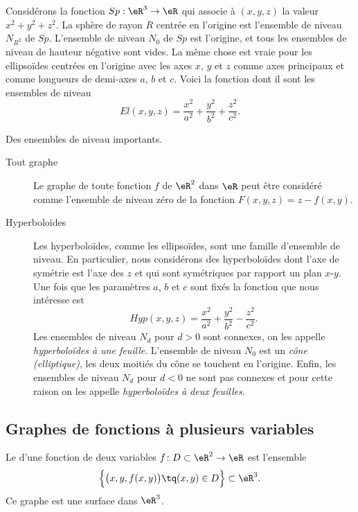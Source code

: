 Considérons la fonction \( Sp: \eR^3\to \eR\) qui associe à \( (x,y,z)\) la valeur \( x^2+y^2+z^2\). La sphère de rayon \( R\) centrée en l'origine est l'ensemble de niveau \( N_{R^2}\) de \( Sp\). L'ensemble de niveau \( N_{0}\) de \( Sp\) est l'origine, et tous les ensembles de niveau de hauteur négative sont vides. La même chose est vraie pour les ellipsoïdes centrées en l'origine avec les axes \( x\), \( y\) et \( z\) comme axes principaux et comme longueurs de demi-axes \( a\), \( b\) et \( c\). Voici la fonction dont il sont les ensembles de niveau
\[
	El(x,y,z)= \frac{x^2}{a^2}+\frac{y^2}{b^2}+\frac{z^2}{c^2}.
\]
\begin{example}
	Des ensembles de niveau importants.
	\begin{description}
		\item[Tout graphe]
			Le graphe de toute fonction \( f\)  de \( \eR^2\) dans \( \eR\) peut être considéré comme l'ensemble de niveau zéro de la fonction \( F(x,y,z)=z-f(x,y)\).

		\item[Hyperboloïdes]
			Les hyperboloïdes, comme les ellipsoïdes, sont une famille d'ensemble de niveau. En particulier, nous considérons des hyperboloïdes dont l'axe de symétrie est l'axe des \( z\) et qui sont symétriques par rapport un plan \( x\)-\( y\).  Une fois que les paramètres  \( a\), \( b\) et \( c\) sont fixés la fonction que nous intéresse est
			\[
				Hyp(x,y,z)= \frac{x^2}{a^2}+\frac{y^2}{b^2}-\frac{z^2}{c^2}.
			\]
			Les ensembles de niveau \( N_d\) pour \( d>0\) sont connexes, on les appelle \emph{hyperboloïdes à une feuille}. L'ensemble de niveau \( N_0\) est un \emph{cône (elliptique)}, les deux moitiés du cône se touchent en l'origine. Enfin, les ensembles de niveau \( N_d\) pour \( d<0\) ne sont  pas connexes et pour cette raison on les appelle \emph{hyperboloïdes à deux feuilles}.
	\end{description}
\end{example}

\subsection{Graphes de fonctions à plusieurs variables}

Le  d'une fonction de deux variables \( f\colon D\subset\eR^2\to \eR\) est l'ensemble
\begin{equation}
	\Big\{   \big( x,y,f(x,y) \big) \tq (x,y)\in D \Big\}\subset\eR^3.
\end{equation}
Ce graphe est une surface dans \( \eR^3\).

